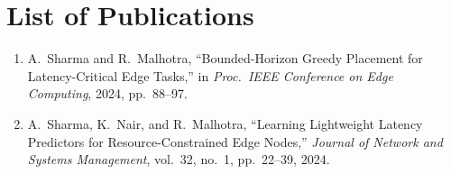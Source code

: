 \chapter{List of Publications}
\label{app:pubs}

\begin{enumerate}[label=\lbrack P\arabic*\rbrack,leftmargin=2.6em]
  \item A.\ Sharma and R.\ Malhotra, ``Bounded-Horizon Greedy Placement for Latency-Critical Edge Tasks,'' in \textit{Proc.\ IEEE Conference on Edge Computing}, 2024, pp.\ 88--97.
  \item A.\ Sharma, K.\ Nair, and R.\ Malhotra, ``Learning Lightweight Latency Predictors for Resource-Constrained Edge Nodes,'' \textit{Journal of Network and Systems Management}, vol.\ 32, no.\ 1, pp.\ 22--39, 2024.
\end{enumerate}
